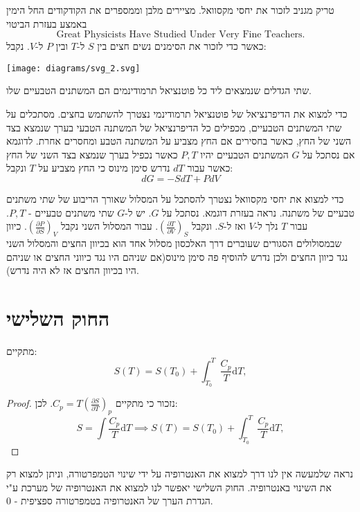 \documentclass{tstextbook}
\begin{document}
טריק מגניב לזכור את יחסי מקסוואל. מציירים מלבן וממספרים את הקודקודים החל הימין באמצע בעזרת הביטוי
$$\text{Great Physicists Have Studied Under Very Fine Teachers.}$$
כאשר כדי לזכור את הסימנים נשים חצים בין \(S\) ל-\(T\) ובין \(P\) ל-\(V\). נקבל:

\texttt{[image: diagrams/svg\_2.svg]}
\begin{proposition}
שתי הגדלים שנמצאים ליד כל פוטנציאל תרמודינמים הם המשתנים הטבעיים שלו.

\end{proposition}
\begin{proposition}
כדי למצוא את הדיפרנציאל של פוטנציאל תרמודינמי נצטרך להשתמש בחצים. מסתכלים על שתי המשתנים הטבעיים, מכפילים כל הדיפרנציאל של המשתנה הטבעי בערך שנמצא בצד השני של החץ, כאשר בחסירים אם החץ מצביע על המשתנה הטבע ומחסרים אחרת. לדוגמא אם נסתכל על \(G\) המשתנים הטבעיים יהיו \(P,T\) כאשר נכפיל בערך שנמצא בצד השני של החץ כאשר עבור \(dT\) נדרש סימן מינוס כי החץ מצביע על \(T\) ונקבל:
$$dG=-SdT+PdV$$

\end{proposition}
\begin{proposition}
כדי למצוא את יחסי מקסוואל נצטרך להסתכל על המסלול שאורך הריבוע של שתי משתנים טבעיים של משתנה. נראה בעזרת דוגמא. נסתכל על \(G\). יש ל-\(G\) שתי משתנים טבעיים - \(P,T\). עבור \(T\) נלך ל-\(V\) ואז ל-\(S\). ונקבל \(\left( \frac{\partial T}{\partial V} \right)_{S}\). עבור המסלול השני נקבל \(\left( \frac{\partial P}{\partial S} \right)_{V}\). כיוון שבמסולולים הסגורים שעוברים דרך האלכסון מסלול אחד הוא בכיוון החצים והמסלול השני נגד כיוון החצים ולכן נדרש להוסיף פה סימן מינוס(אם שניהם היו נגד כיווני החצים או שניהם היו בכיוון החצים אז לא היה נדרש).

\end{proposition}
\section{החוק השלישי}

\begin{proposition}
מתקיים:
$$S(T)=S(T_{0})+\int_{T_{0}}^{T}{\frac{C_{p}}{T}}\mathrm{d}T,$$

\end{proposition}
\begin{proof}
נזכור כי מתקיים \(C_{p}=T\left({\frac{\partial S}{\partial T}}\right)_{p}\). לכן:
$$S=\int{\frac{C_{p}}{T}}\mathrm{d}T\implies S(T)=S(T_{0})+\int_{T_{0}}^{T}{\frac{C_{p}}{T}}\mathrm{d}T,$$

\end{proof}
נראה שלמעשה אין לנו דרך למצוא את האנטרופיה על ידי שינוי הטמפרטורה, וניתן למצוא רק את השינוי באנטרופיה. החוק השלישי יאפשר לנו למצוא את האנטרופיה של מערכת ע"י הגדרת הערך של האנטרופיה בטמפרטורה ספציפית - 0.
\end{document}
